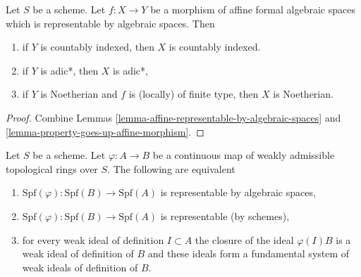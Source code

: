 \begin{lemma}
\label{lemma-property-goes-up-affine}
Let $S$ be a scheme. Let $f : X \to Y$ be a morphism of affine formal
algebraic spaces which is representable by algebraic spaces. Then
\begin{enumerate}
\item if $Y$ is countably indexed, then $X$ is countably indexed.
\item if $Y$ is adic*, then $X$ is adic*,
\item if $Y$ is Noetherian and $f$ is (locally) of finite type, then
$X$ is Noetherian.
\end{enumerate}
\end{lemma}

\begin{proof}
Combine Lemmas \ref{lemma-affine-representable-by-algebraic-spaces} and
\ref{lemma-property-goes-up-affine-morphism}.
\end{proof}

\begin{lemma}
\label{lemma-representable-affine}
Let $S$ be a scheme. Let $\varphi : A \to B$ be a continuous map of
weakly admissible topological rings over $S$. The following
are equivalent
\begin{enumerate}
\item $\text{Spf}(\varphi) : \text{Spf}(B) \to \text{Spf}(A)$
is representable by algebraic spaces,
\item $\text{Spf}(\varphi) : \text{Spf}(B) \to \text{Spf}(A)$
is representable (by schemes),
\item for every weak ideal of definition $I \subset A$
the closure of the ideal $\varphi(I)B$
is a weak ideal of definition of $B$
and these ideals form a fundamental system of weak ideals
of definition of $B$.
\end{enumerate}
\end{lemma}

